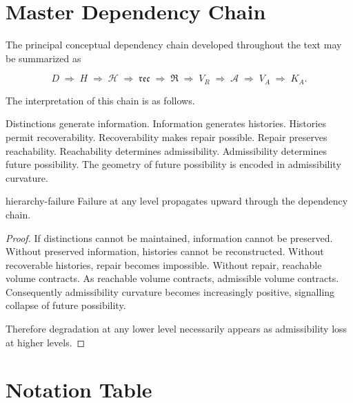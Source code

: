 \documentclass[12pt,twoside,openright]{book}
\newcommand{\hist}{\mathcal{H}}
\newcommand{\repair}{\mathfrak{R}}
\newcommand{\reco}{\mathfrak{rec}}
\begin{document}
\section{Master Dependency Chain}

The principal conceptual dependency chain developed
throughout the text may be summarized as

\[
D
\;\Longrightarrow\;
H
\;\Longrightarrow\;
\hist
\;\Longrightarrow\;
\reco
\;\Longrightarrow\;
\repair
\;\Longrightarrow\;
V_R
\;\Longrightarrow\;
\mathcal A
\;\Longrightarrow\;
V_A
\;\Longrightarrow\;
K_A.
\]

The interpretation of this chain is as follows.

Distinctions generate information.
Information generates histories.
Histories permit recoverability.
Recoverability makes repair possible.
Repair preserves reachability.
Reachability determines admissibility.
Admissibility determines future possibility.
The geometry of future possibility is encoded in
admissibility curvature.

\begin{proposition}{hierarchy-failure}
Failure at any level propagates upward through the
dependency chain.
\end{proposition}

\begin{proof}
If distinctions cannot be maintained, information cannot
be preserved. Without preserved information, histories
cannot be reconstructed. Without recoverable histories,
repair becomes impossible. Without repair, reachable
volume contracts. As reachable volume contracts,
admissible volume contracts. Consequently admissibility
curvature becomes increasingly positive, signalling
collapse of future possibility.

Therefore degradation at any lower level necessarily
appears as admissibility loss at higher levels.
\end{proof}

\section{Notation Table}
\end{document}
